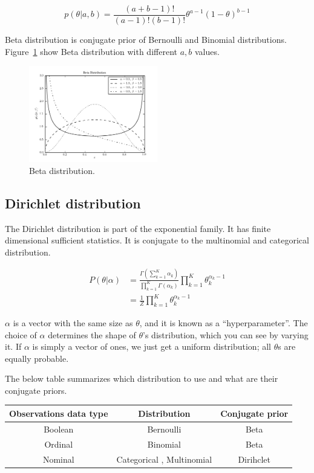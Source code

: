 \begin{equation}
	p(\theta | a,b) = \frac{ (a + b - 1)! }{ (a -1 )! (b - 1)!}\theta^{a -1}  (1 - \theta)^{b - 1}
\end{equation}

Beta distribution is conjugate prior of Bernoulli and Binomial distributions. Figure~\ref{fig:beta} show Beta distribution with different $a,b$ values.

\begin{figure}[htp]
\centering
\includegraphics[width=0.5\textwidth]{images/fig_beta_distribution_1.png}
\caption{Beta distribution. \cite{astroMLText}}
\label{fig:beta}
\end{figure}



\subsection*{Dirichlet distribution}
The Dirichlet distribution is part of the exponential family. It has finite dimensional sufficient statistics. It is conjugate to the multinomial and categorical distribution. 


\begin{align*}
    P (\theta | \alpha) &= \frac{\Gamma (\sum_{k=1}^K \alpha_k)}{\prod_{k=1}^K \Gamma (\alpha_k)}\prod_{k=1}^K \theta_k^{\alpha_k-1} \\
			  &= \frac{1}{Z} \prod_{k=1}^K \theta_k^{\alpha_k-1}
\end{align*}

$\alpha$ is a vector with the same size as $\theta$, and it is known as a ``hyperparameter''.  The choice of $\alpha$ determines the shape of $\theta$'s distribution, which you can see by varying it.  If $\alpha$ is simply a vector of ones, we just get a uniform distribution; all $\theta$s are equally probable.

The below table summarizes which distribution to use and what are their conjugate priors.

\begin{tabular}[htp]{|c|c|c|}
\hline
	\textbf{Observations data type} & \textbf{Distribution} & \textbf{Conjugate prior} \\
\hline
\hline
	Boolean & Bernoulli & Beta \\
\hline
	Ordinal & Binomial & Beta \\
\hline
	Nominal & Categorical , Multinomial & Dirihclet \\
\hline

\end{tabular}


